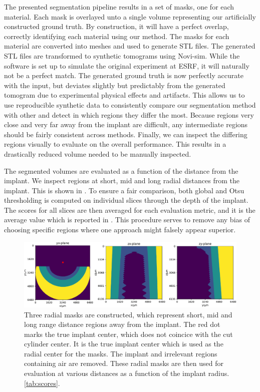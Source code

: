 The presented segmentation pipeline results in a set of masks, one for each
material.  Each mask is overlayed unto a single volume representing our
artificially constructed ground truth. By construction, it will have a perfect
overlap, correctly identifying each material using our method.  The masks for
each material are converted into meshes and used to generate STL files.  The
generated STL files are transformed to synthetic tomograms using Novi-sim.
While the software is set up to simulate the original experiment at ESRF, it
will naturally not be a perfect match. The generated ground truth is now
perfectly accurate with the input, but deviates slightly but predictably from
the generated tomogram due to experimental physical effects and artifacts. This
allows us to use reproducible synthetic data to consistently compare our
segmentation method with other and detect in which regions they differ the
most. Because regions very close and very far away from the implant are
difficult, any intermediate regions should be fairly consistent across methods.
Finally, we can inspect the differing regions visually to evaluate on the
overall performance. This results in a drastically reduced volume needed to be
manually inspected.

The segmented volumes are evaluated as a function of the distance from the
implant. We inspect regions at short, mid and long radial distances from the
implant. This is shown in . To ensure a fair comparison, both
global and Otsu thresholding is computed on individual slices through the depth
of the implant. The scores for all slices are then averaged for each evaluation
metric, and it is the average value which is reported in .
This procedure serves to remove any bias of choosing specific regions where one
approach might falsely appear superior.

\begin{figure}
  \centering
  \includegraphics[width=\textwidth]{figures/radial_masks.pdf}
  \caption{Three radial masks are constructed, which represent short, mid and
	long range distance regions away from the implant. The red dot marks
	the true implant center, which does not coincice with the cut cylinder
	center. It is the true implant center which is used as the radial
	center for the masks. The implant and irrelevant regions containing air
	are removed.  These radial masks are then used for evaluation at
	various distances as a function of the implant radius.
	\cref{tab:scores}.}
  \label{fig:radialmasks}
\end{figure}

